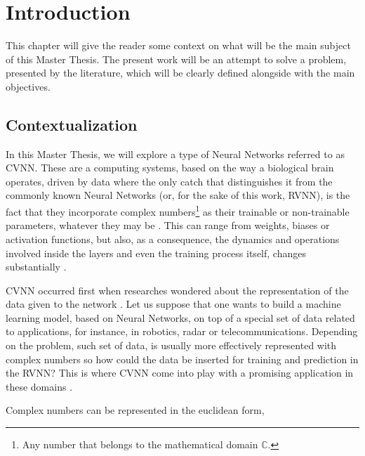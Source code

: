 
% 
\chapter{Introduction}
\label{chap:Chapter1}

This chapter will give the reader some context on what will be the main subject of this Master Thesis. The present work will be an attempt to solve a problem, presented by the literature, which will be clearly defined alongside with the main objectives.

\section{Contextualization}
\label{sec:chap1_context}

In this Master Thesis, we will explore a type of Neural Networks referred to as \gls{CVNN}. These are a computing systems, based on the way a biological brain operates, driven by data where the only catch that distinguishes it from the commonly known Neural Networks (or, for the sake of this work, \gls{RVNN}), is the fact that they incorporate complex numbers\footnote{Any number that belongs to the mathematical domain $\mathbb{C}$.} as their trainable or non-trainable parameters, whatever they may be \parencite{bassey2021survey, monning2019deep, clarke1990definition}. This can range from weights, biases or activation functions, but also, as a consequence, the dynamics and operations involved inside the layers and even the training process itself, changes substantially \parencite{bassey2021survey}.

\gls{CVNN} occurred first when researches wondered about the representation of the data given to the network \parencite{bassey2021survey}. Let us suppose that one wants to build a machine learning model, based on Neural Networks, on top of a special set of data related to applications, for instance, in robotics, radar or telecommunications. Depending on the problem, such set of data, is usually more effectively represented with complex numbers so how could the data be inserted for training and prediction in the \gls{RVNN}? This is where \gls{CVNN} come into play with a promising application in these domains \parencite{bassey2021survey, hirose2012complex}.

Complex numbers can be represented in the euclidean form,


